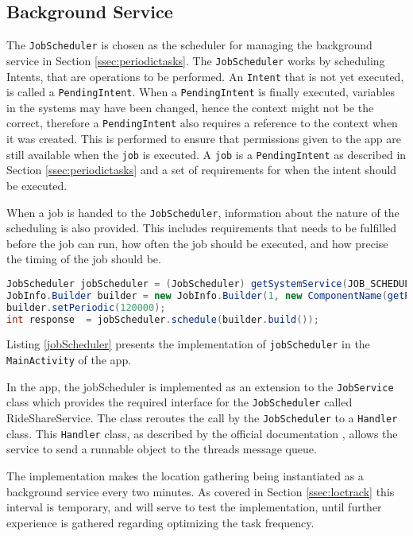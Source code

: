 \subsection{Background Service}
The \texttt{JobScheduler} is chosen as the scheduler for managing the background service in Section \ref{ssec:periodictasks}.
The \texttt{JobScheduler} works by scheduling Intents, that are operations to be performed. 
An \texttt{Intent} that is not yet executed, is called a \texttt{PendingIntent}.
When a \texttt{PendingIntent} is finally executed, variables in the systems may have been changed, hence the context might not be the correct, therefore a \texttt{PendingIntent} also requires a reference to the context when it was created.
This is performed to ensure that permissions given to the app are still available when the \texttt{job} is executed.
A \texttt{job} is a \texttt{PendingIntent} as described in Section \ref{ssec:periodictasks} and a set of requirements for when the intent should be executed.

When a job is handed to the \texttt{JobScheduler}, information about the nature of the scheduling is also provided.
This includes requirements that needs to be fulfilled before the job can run, how often the job should be executed, and how precise the timing of the job should be.

\begin{lstlisting}[language=Java, label=jobScheduler, caption=The implementation of jobScheduler.]
JobScheduler jobScheduler = (JobScheduler) getSystemService(JOB_SCHEDULER_SERVICE);
JobInfo.Builder builder = new JobInfo.Builder(1, new ComponentName(getPackageName(), RideShareService.class.getName()));
builder.setPeriodic(120000);
int response  = jobScheduler.schedule(builder.build());	
\end{lstlisting}

Listing \ref{jobScheduler} presents the implementation of \texttt{jobScheduler} in the \texttt{MainActivity} of the app.

In the app, the jobScheduler is implemented as an extension to the \texttt{JobService} class which provides the required interface for the \texttt{JobScheduler} called RideShareService.
The class reroutes the call by the \texttt{JobScheduler} to a \texttt{Handler} class.
This \texttt{Handler} class, as described by the official documentation \cite{handler}, allows the service to send a runnable object to the threads message queue.


The implementation makes the location gathering being instantiated as a background service every two minutes.
As covered in Section \ref{ssec:loctrack} this interval is temporary, and will serve to test the implementation, until further experience is gathered regarding optimizing the task frequency.


